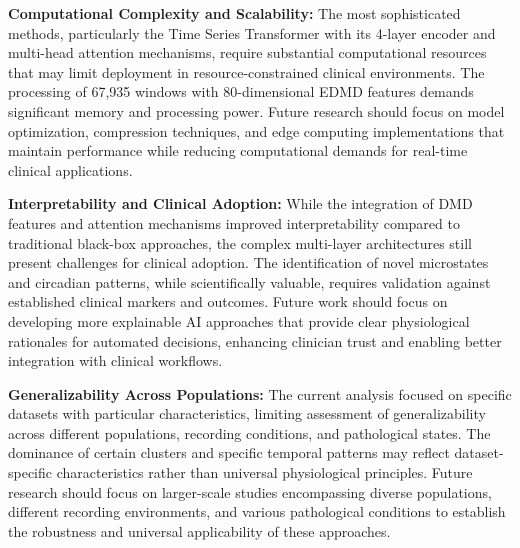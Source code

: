 \documentclass[a4paper,12pt,twoside]{article}
\begin{document}
\textbf{Computational Complexity and Scalability:}
The most sophisticated methods, particularly the Time Series Transformer with its 4-layer encoder and multi-head attention mechanisms, require substantial computational resources that may limit deployment in resource-constrained clinical environments. The processing of 67,935 windows with 80-dimensional EDMD features demands significant memory and processing power. Future research should focus on model optimization, compression techniques, and edge computing implementations that maintain performance while reducing computational demands for real-time clinical applications.

\textbf{Interpretability and Clinical Adoption:}
While the integration of DMD features and attention mechanisms improved interpretability compared to traditional black-box approaches, the complex multi-layer architectures still present challenges for clinical adoption. The identification of novel microstates and circadian patterns, while scientifically valuable, requires validation against established clinical markers and outcomes. Future work should focus on developing more explainable AI approaches that provide clear physiological rationales for automated decisions, enhancing clinician trust and enabling better integration with clinical workflows.

\textbf{Generalizability Across Populations:}
The current analysis focused on specific datasets with particular characteristics, limiting assessment of generalizability across different populations, recording conditions, and pathological states. The dominance of certain clusters and specific temporal patterns may reflect dataset-specific characteristics rather than universal physiological principles. Future research should focus on larger-scale studies encompassing diverse populations, different recording environments, and various pathological conditions to establish the robustness and universal applicability of these approaches.
\end{document}
